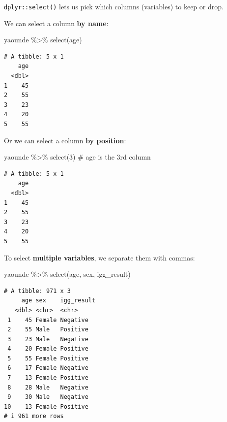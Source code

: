 \documentclass[
  letterpaper,
  DIV=11,
  numbers=noendperiod]{scrreprt}
\newenvironment{Shaded}{\begin{snugshade}}{\end{snugshade}}
\newcommand{\CommentTok}[1]{\textcolor[rgb]{0.37,0.37,0.37}{#1}}
\newcommand{\DecValTok}[1]{\textcolor[rgb]{0.68,0.00,0.00}{#1}}
\newcommand{\FunctionTok}[1]{\textcolor[rgb]{0.28,0.35,0.67}{#1}}
\newcommand{\NormalTok}[1]{\textcolor[rgb]{0.00,0.23,0.31}{#1}}
\newcommand{\SpecialCharTok}[1]{\textcolor[rgb]{0.37,0.37,0.37}{#1}}
\begin{document}
\texttt{dplyr::select()} lets us pick which columns (variables) to keep
or drop.

We can select a column \textbf{by name}:

\begin{Shaded}
\begin{Highlighting}[]
\NormalTok{yaounde }\SpecialCharTok{\%\textgreater{}\%} \FunctionTok{select}\NormalTok{(age) }
\end{Highlighting}
\end{Shaded}

\begin{verbatim}
# A tibble: 5 x 1
    age
  <dbl>
1    45
2    55
3    23
4    20
5    55
\end{verbatim}

Or we can select a column \textbf{by position}:

\begin{Shaded}
\begin{Highlighting}[]
\NormalTok{yaounde }\SpecialCharTok{\%\textgreater{}\%} \FunctionTok{select}\NormalTok{(}\DecValTok{3}\NormalTok{) }\CommentTok{\# \textasciigrave{}age\textasciigrave{} is the 3rd column}
\end{Highlighting}
\end{Shaded}

\begin{verbatim}
# A tibble: 5 x 1
    age
  <dbl>
1    45
2    55
3    23
4    20
5    55
\end{verbatim}

To select \textbf{multiple variables}, we separate them with commas:

\begin{Shaded}
\begin{Highlighting}[]
\NormalTok{yaounde }\SpecialCharTok{\%\textgreater{}\%} \FunctionTok{select}\NormalTok{(age, sex, igg\_result)}
\end{Highlighting}
\end{Shaded}

\begin{verbatim}
# A tibble: 971 x 3
     age sex    igg_result
   <dbl> <chr>  <chr>     
 1    45 Female Negative  
 2    55 Male   Positive  
 3    23 Male   Negative  
 4    20 Female Positive  
 5    55 Female Positive  
 6    17 Female Negative  
 7    13 Female Positive  
 8    28 Male   Negative  
 9    30 Male   Negative  
10    13 Female Positive  
# i 961 more rows
\end{verbatim}
\end{document}
